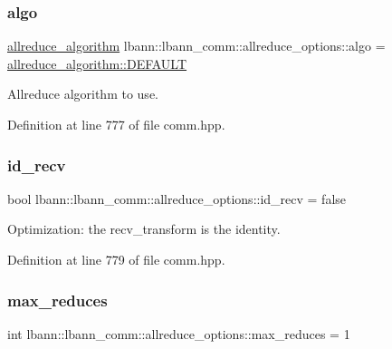 \subsubsection{\texorpdfstring{algo}{algo}}
{\footnotesize\ttfamily \hyperlink{classlbann_1_1lbann__comm_a02a03227cc27e3516f0d9f9812f32019}{allreduce\+\_\+algorithm} lbann\+::lbann\+\_\+comm\+::allreduce\+\_\+options\+::algo = \hyperlink{classlbann_1_1lbann__comm_a02a03227cc27e3516f0d9f9812f32019a5b39c8b553c821e7cddc6da64b5bd2ee}{allreduce\+\_\+algorithm\+::\+D\+E\+F\+A\+U\+LT}}

Allreduce algorithm to use. 

Definition at line 777 of file comm.\+hpp.

\mbox{\label{structlbann_1_1lbann__comm_1_1allreduce__options_a91ab3b21e8345915d3a8eedb65c2f52e}} 
\subsubsection{\texorpdfstring{id\+\_\+recv}{id\_recv}}
{\footnotesize\ttfamily bool lbann\+::lbann\+\_\+comm\+::allreduce\+\_\+options\+::id\+\_\+recv = false}

Optimization\+: the recv\+\_\+transform is the identity. 

Definition at line 779 of file comm.\+hpp.

\mbox{\label{structlbann_1_1lbann__comm_1_1allreduce__options_a4b3cd4eb74dd5a49ee3ffafa2edc1607}} 
\subsubsection{\texorpdfstring{max\+\_\+reduces}{max\_reduces}}
{\footnotesize\ttfamily int lbann\+::lbann\+\_\+comm\+::allreduce\+\_\+options\+::max\+\_\+reduces = 1}

